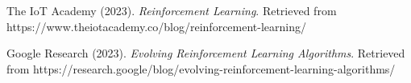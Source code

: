 \documentclass{article}
\begin{document}
\begin{thebibliography}{9}
The IoT Academy (2023). \textit{Reinforcement Learning}. Retrieved from https://www.theiotacademy.co/blog/reinforcement-learning/

Google Research (2023). \textit{Evolving Reinforcement Learning Algorithms}. Retrieved from https://research.google/blog/evolving-reinforcement-learning-algorithms/
\end{thebibliography}
\end{document}
